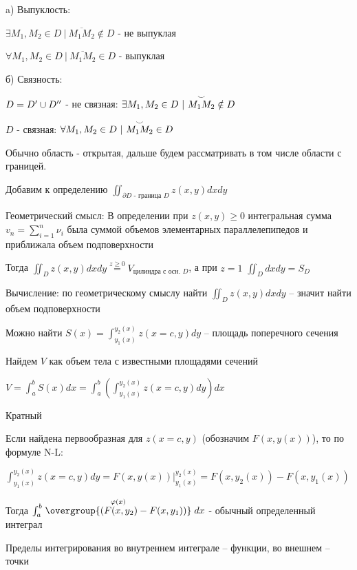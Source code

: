\documentclass[12pt]{article}
\begin{document}
    a) Выпуклость:

    $\exists M_1, M_2 \in D \ | \ \overline{M_1 M_2} \notin D$ - не выпуклая

    $\forall M_1, M_2 \in D \ | \ \overline{M_1 M_2} \in D$ - выпуклая

    б) Связность:

    $D = D^\prime \cup D^{\prime\prime}$ - не связная: $\exists M_1, M_2 \in D \ | \ \overset{\LARGE\smile}{M_1 M_2} \notin D$

    $D$ - связная: $\forall M_1, M_2 \in D \ | \ \overset{\LARGE\smile}{M_1 M_2} \in D$

    Обычно область - открытая, дальше будем рассматривать в том числе области с границей.

    Добавим к определению $\iint_{\partial D \text{ - граница } D} z(x, y) dx dy$

    Геометрический смысл: В определении при $z(x, y) \geq 0$ интегральная сумма $v_n = \sum_{i=1}^n \nu_i$ была суммой объемов элементарных параллелепипедов и приближала объем подповерхности

    Тогда $\iint_D z(x, y) dx dy \stackrel{z \geq 0}{=} V_{\text{цилиндра с осн. } D}$, а при $z = 1$ $\iint_D dx dy = S_D$

    \hypertarget{doubleintegralcalculation}{}

    Вычисление: по геометрическому смыслу найти $\iint_D z(x, y) dx dy$ -- значит найти объем подповерхности

    Можно найти $S(x) = \int^{y_2(x)}_{y_1(x)} z(x = c, y) dy$ -- площадь поперечного сечения

    Найдем $V$ как объем тела с известными площадями сечений

    $V = \int^b_a S(x) dx = \int_a^b \left(\int^{y_2(x)}_{y_1(x)} z(x = c, y) dy\right) dx$

    \hypertarget{multipleintegral}{}

    \Nota Кратный

    Если найдена первообразная для $z(x = c, y)$ (обозначим $F(x, y(x))$), то по формуле N-L:

    $\int^{y_2(x)}_{y_1(x)} z(x = c, y) dy = F(x, y(x)) \Big|^{y_2(x)}_{y_1(x)} = F(x, y_2(x)) - F(x, y_1(x))$

    Тогда $\int^b_a \stackrel{\varphi(x)}{\overgroup{(F(x, y_2) - F(x, y_1))}} dx$ - обычный определенный интеграл

    Пределы интегрирования во внутреннем интеграле -- функции, во внешнем -- точки
\end{document}
